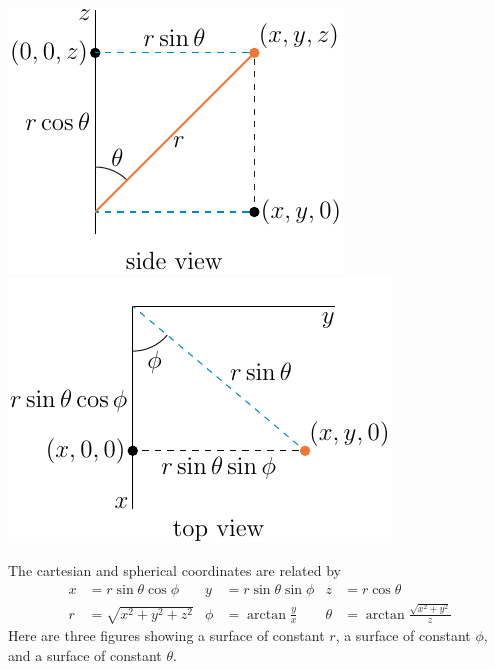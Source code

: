 \begin{efig}
\begin{center}
    \includegraphics{sphericalSide.pdf}\qquad
    \includegraphics{sphericalTop.pdf}\qquad
\end{center}
\end{efig}
The cartesian and spherical coordinates
are related by
\begin{align*}
x&=r\sin\theta\cos\phi &
y&=r\sin\theta\sin\phi &
z&=r\cos\theta \\
 r&=\sqrt{x^2+y^2+z^2} &
 \phi&=\arctan\frac{y}{x} &
 \theta&=\arctan\frac{\sqrt{x^2+y^2}}{z}
\end{align*}
Here are three figures showing a surface of constant $r$,
a surface of constant $\phi$, and a surface of constant $\theta$.
